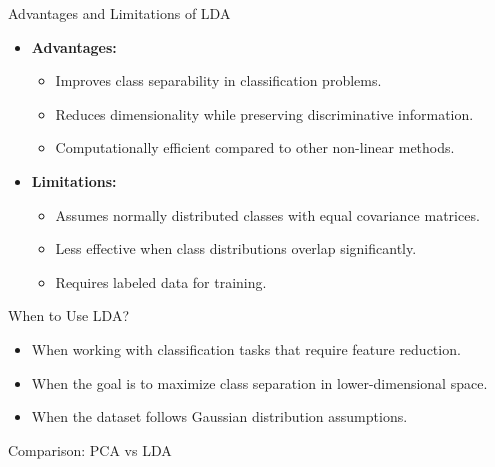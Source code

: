 \documentclass[11pt]{beamer}
\begin{document}
%
%
\begin{frame}{Advantages and Limitations of LDA}
    \begin{itemize}
        \item \textbf{Advantages:}
        \begin{itemize}
            \item Improves class separability in classification problems.
            \item Reduces dimensionality while preserving discriminative information.
            \item Computationally efficient compared to other non-linear methods.
        \end{itemize}
        \item \textbf{Limitations:}
        \begin{itemize}
            \item Assumes normally distributed classes with equal covariance matrices.
            \item Less effective when class distributions overlap significantly.
            \item Requires labeled data for training.
        \end{itemize}
    \end{itemize}
\end{frame}
%
%
\begin{frame}{When to Use LDA?}
    \begin{itemize}
        \item When working with classification tasks that require feature reduction.
        \item When the goal is to maximize class separation in lower-dimensional space.
        \item When the dataset follows Gaussian distribution assumptions.
    \end{itemize}
\end{frame}
%
%
\begin{frame}{Comparison: PCA vs LDA}
\end{frame}
\end{document}
